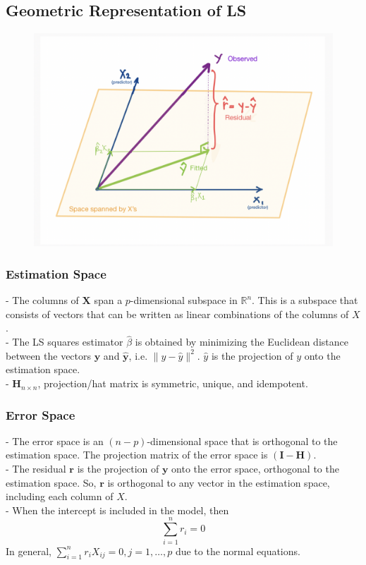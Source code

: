 \documentclass[11pt,a4paper]{article}
\begin{document}
\subsection{Geometric Representation of LS}
\begin{center}\begin{figure}[htbp]
    \centering
    \includegraphics[scale=0.5]{截屏2021-09-05 22.22.04.png}
    \caption{}
    \label{}
\end{figure}\end{center}
\subsubsection{Estimation Space}
- The columns of $\mathbf{X}$ span a $p$-dimensional subspace in $\mathbb{R}^{n}$. This is a subspace that consists of vectors that can be written as linear combinations of the columns of $X$.\\
- The LS squares estimator $\hat{\beta}$ is obtained by minimizing the Euclidean distance between the vectors $\mathbf{y}$ and $\hat{\mathbf{y}}$, i.e. $\|y-\hat{y}\|^{2}$. $\hat{y}$ is the projection of $y$ onto the estimation space.\\
- $\mathbf{H}_{n \times n}$, projection/hat matrix is symmetric, unique, and idempotent.\\
\subsubsection{Error Space}
- The error space is an $(n-p)$-dimensional space that is orthogonal to the estimation space. The projection matrix of the error space is $(\mathbf{I}-\mathbf{H})$.\\
- The residual $\mathbf{r}$ is the projection of $\boldsymbol{y}$ onto the error space, orthogonal to the estimation space. So, $\mathbf{r}$ is orthogonal to any vector in the estimation space, including each column of $X$.\\
- When the intercept is included in the model, then
$$
\sum_{i=1}^{n} r_{i}=0
$$
In general, $\sum_{i=1}^{n} r_{i} X_{i j}=0, j=1, \ldots, p$ due to the normal equations.
\end{document}
